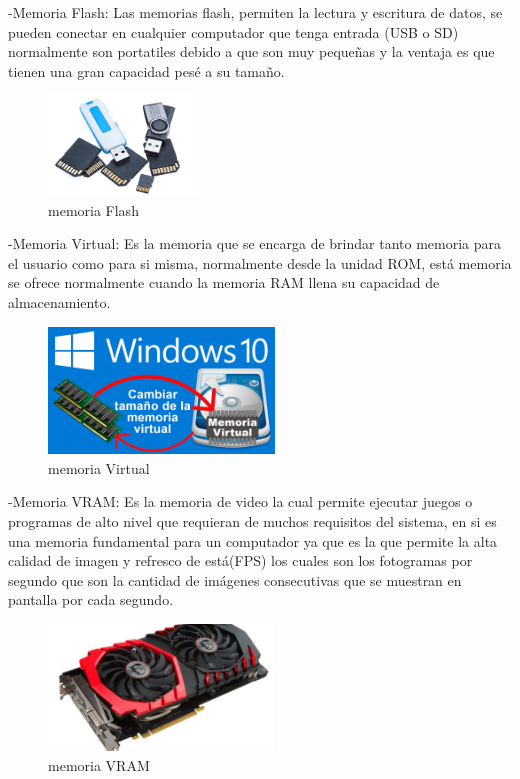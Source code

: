 \documentclass{article}
\begin{document}
-Memoria Flash: Las memorias flash, permiten la lectura y escritura de datos, se pueden conectar en cualquier computador que tenga entrada (USB o SD) normalmente son portatiles debido a que son muy pequeñas y la ventaja es que tienen una gran capacidad pesé a su tamaño. \newline
\begin{figure}[h]
\includegraphics[width=4cm]{Flash.jpg}
\centering
\caption{memoria Flash}
\end{figure}

-Memoria Virtual: Es la memoria que se encarga de brindar tanto memoria para el usuario como para si misma, normalmente desde la unidad ROM, está memoria se ofrece normalmente cuando la memoria RAM llena su capacidad de almacenamiento. \newline
\begin{figure}[h]
\includegraphics[width=6cm]{Virtual.png}
\centering
\caption{memoria Virtual}
\end{figure}

-Memoria VRAM: Es la memoria de video la cual permite ejecutar juegos o programas de alto nivel que requieran de muchos requisitos del sistema, en si es una memoria fundamental para un computador ya que es la que permite la alta calidad de imagen y refresco de está(FPS) los cuales son los fotogramas por segundo que son la cantidad de imágenes consecutivas que se muestran en pantalla por cada segundo. \newline
\begin{figure}[h]
\includegraphics[width=6cm]{Vram.jpg}
\centering
\caption{memoria VRAM}
\end{figure}
\end{document}
